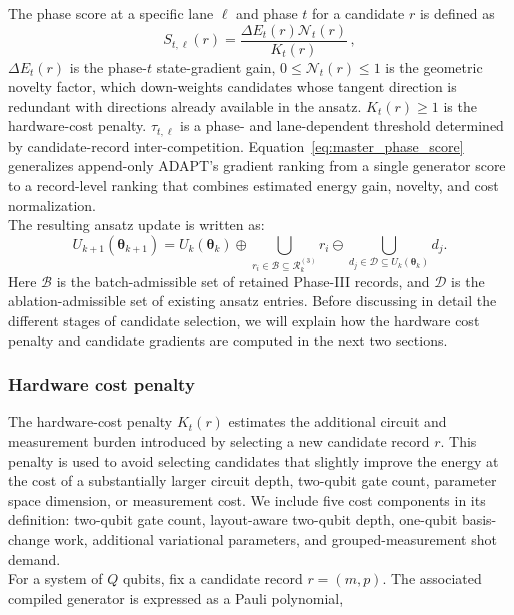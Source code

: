 \documentclass[
  reprint,
  amsmath,
  amssymb,
  aps,
  pra,
  nofootinbib,
  superscriptaddress,
  floatfix
]{revtex4-2}
\begin{document}
%
The phase score at a specific lane \(\ell\) and phase \(t\) for a candidate \(r\) is defined as
%
\begin{equation}
S_{t,\ell}(r)
=
\frac{\Delta E_t(r)\mathcal N_t(r)}{K_t(r)}\,,
\label{eq:master_phase_score}
\end{equation}
\(\Delta E_t(r)\) is the phase-\(t\) state-gradient gain, \(0\leq\mathcal N_t(r)\leq 1\) is the geometric novelty factor, which down-weights candidates whose tangent direction is redundant with directions already available in the ansatz. \(K_t(r) \geq 1\) is the hardware-cost penalty. \(\tau_{t,\ell}\) is a phase- and lane-dependent threshold determined by candidate-record inter-competition. Equation~\eqref{eq:master_phase_score} generalizes append-only ADAPT's gradient ranking from a single generator score to a record-level ranking that combines estimated energy gain, novelty, and cost normalization.\\
The resulting ansatz update is written as:
%
\begin{equation}
U_{k+1}(\boldsymbol\theta_{k+1})
=
U_k(\boldsymbol\theta_{k})
\oplus
\bigcup_{r_i\in\mathcal B\subseteq\mathcal R_k^{(3)}}r_i
\ominus
\bigcup_{d_j\in\mathcal D\subseteq U_k(\boldsymbol\theta_k)}d_j .
\label{eq:snake_ansatz_update}
\end{equation}
%
Here $\mathcal B$ is the batch-admissible set of retained Phase-III records, and $\mathcal D$ is the ablation-admissible set of existing ansatz entries. Before discussing in detail the different stages of candidate selection, we will explain how the hardware cost penalty and candidate gradients are computed in the next two sections.

\subsubsection{Hardware cost penalty}
%
\noindent
The hardware-cost penalty \(K_t(r)\) estimates the additional circuit and measurement burden introduced by selecting a new candidate record \(r\). This penalty is used to avoid selecting candidates that slightly improve the energy at the cost of a substantially larger circuit depth, two-qubit gate count, parameter space dimension, or measurement cost. We include five cost components in its definition: two-qubit gate count, layout-aware two-qubit depth, one-qubit basis-change work, additional variational parameters, and grouped-measurement shot demand.\\
\noindent
For a system of \(Q\) qubits, fix a candidate record \(r=(m,p)\). The associated compiled generator is expressed as a Pauli polynomial,
\end{document}
